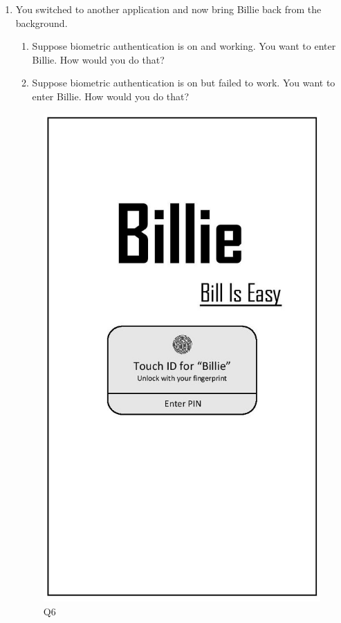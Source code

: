 \documentclass{sigchi}
\begin{document}
\begin{enumerate}
\newpage
\item You switched to another application and now bring Billie back from the background.
    \begin{enumerate}
    \item Suppose biometric authentication is on and working. You want to enter Billie. How would you do that?
    \item Suppose biometric authentication is on but failed to work. You want to enter Billie. How would you do that?
    \end{enumerate}
    
    \begin{figure}[h!]
\centering
  \includegraphics[width=0.5\columnwidth]{6.jpg}
  \caption{Q6}
  \label{fig:ADfigure10}
\end{figure}


\end{enumerate}
\end{document}
